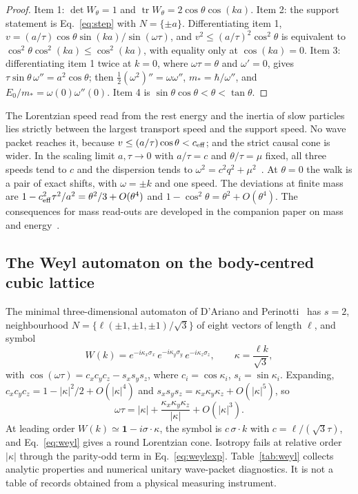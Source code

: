 \documentclass[12pt]{article}
\theoremstyle{definition}
\theoremstyle{remark}
\newcommand{\tr}{\operatorname{tr}}
\begin{document}
\begin{proof}
Item 1: $\det W_\theta=1$ and $\tr W_\theta=2\cos\theta\cos(ka)$. Item 2: the support statement is Eq.~\eqref{eq:step} with $N=\{\pm a\}$. Differentiating item 1, $v=(a/\tau)\cos\theta\sin(ka)/\sin(\omega\tau)$, and $v^2\le(a/\tau)^2\cos^2\theta$ is equivalent to $\cos^2\theta\cos^2(ka)\le\cos^2(ka)$, with equality only at $\cos(ka)=0$. Item 3: differentiating item 1 twice at $k=0$, where $\omega\tau=\theta$ and $\omega'=0$, gives $\tau\sin\theta\,\omega''=a^2\cos\theta$; then $\tfrac12(\omega^2)''=\omega\omega''$, $m_*=\hbar/\omega''$, and $E_0/m_*=\omega(0)\omega''(0)$. Item 4 is $\sin\theta\cos\theta<\theta<\tan\theta$.
\end{proof}

The Lorentzian speed read from the rest energy and the inertia of slow particles lies strictly between the largest transport speed and the support speed. No wave packet reaches it, because $v\le(a/\tau)\cos\theta<c_{\rm eff}$; and the strict causal cone is wider. In the scaling limit $a,\tau\to0$ with $a/\tau=c$ and $\theta/\tau=\mu$ fixed, all three speeds tend to $c$ and the dispersion tends to $\omega^2=c^2q^2+\mu^2$~\cite{Strauch2006,BisioDArianoTosini2015}. At $\theta=0$ the walk is a pair of exact shifts, with $\omega=\pm k$ and one speed. The deviations at finite mass are $1-c_{\rm eff}^2\tau^2/a^2=\theta^2/3+O(\theta^4)$ and $1-\cos^2\theta=\theta^2+O(\theta^4)$. The consequences for mass read-outs are developed in the companion paper on mass and energy~\cite{Liu2026QRAIF_ME}.

\subsection{The Weyl automaton on the body-centred cubic lattice}
\label{sec:weyl}

The minimal three-dimensional automaton of D'Ariano and Perinotti~\cite{DArianoPerinotti2014} has $s=2$, neighbourhood $N=\{\ell(\pm1,\pm1,\pm1)/\sqrt3\}$ of eight vectors of length $\ell$, and symbol
\begin{equation}
W(k)=e^{-i\kappa_x\sigma_x}\,e^{-i\kappa_y\sigma_y}\,e^{-i\kappa_z\sigma_z},\qquad \kappa=\frac{\ell k}{\sqrt3},
\label{eq:weylqca}
\end{equation}
with $\cos(\omega\tau)=c_xc_yc_z-s_xs_ys_z$, where $c_i=\cos\kappa_i$, $s_i=\sin\kappa_i$. Expanding, $c_xc_yc_z=1-|\kappa|^2/2+O(|\kappa|^4)$ and $s_xs_ys_z=\kappa_x\kappa_y\kappa_z+O(|\kappa|^5)$, so
\begin{equation}
\omega\tau=|\kappa|+\frac{\kappa_x\kappa_y\kappa_z}{|\kappa|}+O(|\kappa|^3).
\label{eq:weylexp}
\end{equation}
At leading order $W(k)\simeq\mathbf 1-i\sigma\cdot\kappa$, the symbol is $c\,\sigma\cdot k$ with $c=\ell/(\sqrt3\tau)$, and Eq.~\eqref{eq:weyl} gives a round Lorentzian cone. Isotropy fails at relative order $|\kappa|$ through the parity-odd term in Eq.~\eqref{eq:weylexp}. Table~\ref{tab:weyl} collects analytic properties and numerical unitary wave-packet diagnostics. It is not a table of records obtained from a physical measuring instrument.
\end{document}
